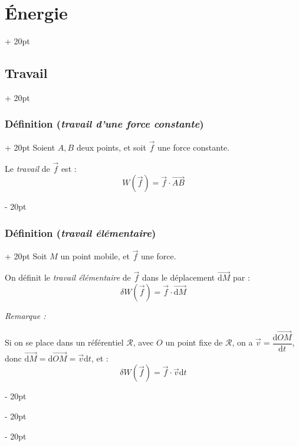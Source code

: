 \documentclass[a4paper, 12pt, twoside]{article}
\newcommand{\dt}[2][t]{\dfrac{\mathrm d #2}{\mathrm d #1}} %
\newcommand{\vect}{\overrightarrow}
\newcommand{\lr}[1]{\left( #1 \right)}
\newcommand{\ind}[1][20pt]{\advance\leftskip + #1}
\newcommand{\deind}[1][20pt]{\advance\leftskip - #1}
\newenvironment{indt}[2][20pt]{#2 \par \ind[#1]}{\par \deind} %
\begin{document}
    \vspace{12pt}
    
    \begin{indt}{\section{\'Energie}}
        \begin{indt}{\subsection{Travail}}
            \begin{indt}{\subsubsection{Définition (\textit{travail d'une force constante})}}
                Soient $A, B$ deux points, et soit $\vec f$ une force constante.

                \vspace{6pt}
                
                Le \textit{travail} de $\vec f$ est :
                \[
                    W\!\lr{\vec f} = \vec f \cdot \vect{AB}
                \]
            \end{indt}

            \vspace{12pt}
            
            \begin{indt}{\subsubsection{Définition (\textit{travail élémentaire})}}
                Soit $M$ un point mobile, et $\vec f$ une force.

                \vspace{6pt}
                
                On définit le \textit{travail élémentaire} de $\vec f$ dans le déplacement $\vect{\mathrm d M}$ par :
                \[
                    \delta W\!\lr{\vec f} = \vec f \cdot \vect{\mathrm d M}
                \]

                \vspace{12pt}
                
                \textit{Remarque :}

                Si on se place dans un référentiel $\mathscr R$, avec $O$ un point fixe de $\mathscr R$, on a $\vec v = \dt{\vect{OM}}$, donc $\vect{\mathrm d M} = \mathrm d \vect{OM} = \vec v \mathrm dt$, et :
                \[
                    \delta W\!\lr{\vec f} = \vec f \cdot \vec v \mathrm dt
                \]
            \end{indt}


\end{indt}
\end{indt}
\end{document}
